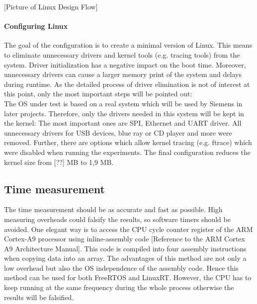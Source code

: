 [Picture of Linux Design Flow]
\paragraph{Configuring Linux}
The goal of the configuration is to create a minimal version of Linux.
This means to eliminate unnecessary drivers and kernel tools (e.g. tracing tools) from the system. 
Driver initialization has a negative impact on the boot time.
Moreover, unnecessary drivers can cause a larger memory print of the system and delays during runtime. 
As the detailed process of driver elimination is not of interest at this point, only the most important steps will be pointed out:
\\The \ac{OS} under test is based on a real system which will be used by Siemens in later projects.
Therefore, only the drivers needed in this system will be kept in the kernel:
The most important ones are \ac{SPI}, Ethernet and \ac{UART} driver.
All unnecessary drivers for \ac{USB} devices, blue ray or CD player and more were removed.
Further, there are options which allow kernel tracing (e.g. ftrace) which were disabled when running the experiments.  
The final configuration reduces the kernel size from [??] MB to 1,9 MB. 

\subsection{Time measurement}
The time measurement should be as accurate and fast as possible.
High measuring overheads could falsify the results, so software timers should be avoided. 
One elegant way is to access the \ac{CPU} cycle counter register of the ARM Cortex-A9 processor using inline-assembly code [Reference to the ARM Cortex A9 Architecture Manual].
This code is compiled into four assembly instructions when copying data into an array.
The advantages of this method are not only a low overhead but also the \ac{OS} independence of the assembly code.
Hence this method can be used for both FreeRTOS and LinuxRT.
However, the \ac{CPU} has to keep running at the same frequency during the whole process otherwise the results will be falsified. 

